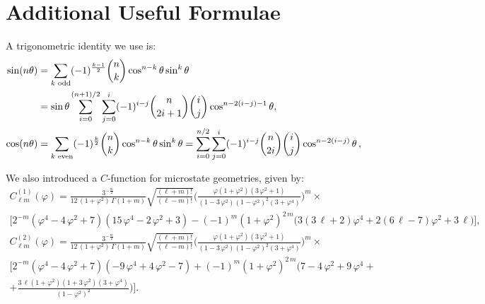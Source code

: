 \documentclass[12pt,a4paper]{article}
\begin{document}
\section{Additional Useful Formulae}\label{app:multAngles}\label{app:CfuncsMG}

A trigonometric identity we use is:
\begin{align}
\sin(n\theta )&=\sum _{k{\text{ odd}}}(-1)^{\frac {k-1}{2}}{n \choose k}\cos ^{n-k}\theta \sin ^{k}\theta\notag\\
&=\sin \theta \sum _{i=0}^{(n+1)/2}\sum _{j=0}^{i}(-1)^{i-j}{n \choose 2i+1}{i \choose j}\cos ^{n-2(i-j)-1}\theta ,\\\cos(n\theta )&=\sum _{k{\text{ even}}}(-1)^{\frac {k}{2}}{n \choose k}\cos ^{n-k}\theta \sin ^{k}\theta =\sum _{i=0}^{n/2}\sum _{j=0}^{i}(-1)^{i-j}{n \choose 2i}{i \choose j}\cos ^{n-2(i-j)}\theta \,,
\end{align}

We also introduced a $C$-function for microstate geometries, given by:
\begin{multline}
C^{(1)}_{\ell m}(\varphi)=\frac{3^{-\frac{m}{2}}}{12\,(1+\varphi^2)\,\Gamma(1+m)}\sqrt{\frac{(\ell+m)!}{(\ell-m)!}}\Bigg(\frac{\varphi(1+\varphi^2)(3\,\varphi^2+1)}{(1-3\,\varphi^2)(1-\varphi^2)^2(3+\varphi^4)}\Bigg)^m\times\\
\big[2^{-m}(\varphi^4-4\,\varphi^2+7)(15\,\varphi^4-2\,\varphi^2+3)-(-1)^m(1+\varphi^2)^{2\,m}\big(3(3\,\ell+2)\varphi^4+2(6\,\ell-7)\varphi^2+3\,\ell\big)\big],\\
C^{(2)}_{\ell m}(\varphi)=\frac{3^{-\frac{m}{2}}}{12\,(1+\varphi^2)\,\Gamma(1+m)}\sqrt{\frac{(\ell+m)!}{(\ell-m)!}}\Bigg(\frac{\varphi(1+\varphi^2)(3\,\varphi^2+1)}{(1-3\,\varphi^2)(1-\varphi^2)^2(3+\varphi^4)}\Bigg)^m\times\\
\bigg[2^{-m}(\varphi^4-4\,\varphi^2+7)(-9\,\varphi^4+4\,\varphi^2-7)+(-1)^m(1+\varphi^2)^{2\,m}\bigg(7-4\,\varphi^2+9\,\varphi^4+\\
+\frac{3\,\ell(1+\varphi^2)(1+3\,\varphi^2)(3+\varphi^4)}{(1-\varphi^2)^2}\bigg)\bigg].
\end{multline}



\end{document}
